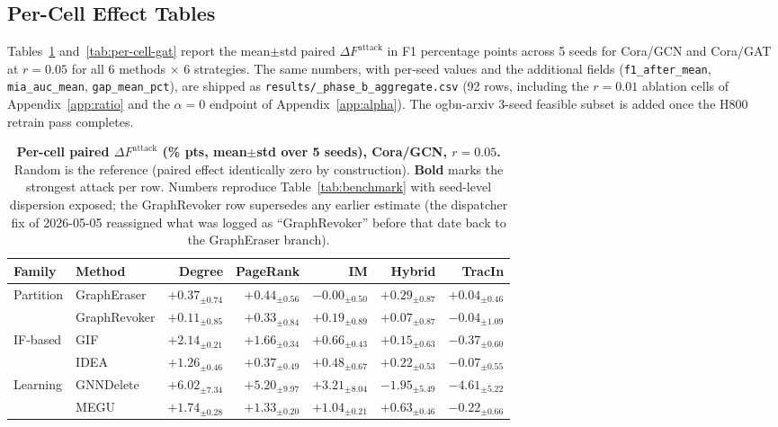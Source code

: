 \subsection{Per-Cell Effect Tables}
\label{app:per-cell}
Tables~\ref{tab:per-cell-gcn} and~\ref{tab:per-cell-gat} report the
mean$\pm$std paired $\Delta F^{\mathrm{attack}}$ in F1 percentage
points across 5 seeds for Cora/GCN and Cora/GAT at $r{=}0.05$ for
all 6 methods $\times$ 6 strategies. The same numbers, with per-seed
values and the additional fields (\texttt{f1\_after\_mean},
\texttt{mia\_auc\_mean}, \texttt{gap\_mean\_pct}), are shipped as
\texttt{results/\_phase\_b\_aggregate.csv} (92 rows, including the
$r{=}0.01$ ablation cells of Appendix~\ref{app:ratio} and the
$\alpha{=}0$ endpoint of Appendix~\ref{app:alpha}). The ogbn-arxiv
3-seed feasible subset is added once the H800 retrain pass completes.

\begin{table}[h]
\centering
\footnotesize
\setlength{\tabcolsep}{4pt}
\caption{\textbf{Per-cell paired $\Delta F^{\mathrm{attack}}$ (\% pts,
mean$\pm$std over 5 seeds), Cora/GCN, $r{=}0.05$.} Random is the
reference (paired effect identically zero by construction).
\textbf{Bold} marks the strongest attack per row. Numbers reproduce
Table~\ref{tab:benchmark} with seed-level dispersion exposed; the
GraphRevoker row supersedes any earlier estimate (the dispatcher fix
of 2026-05-05 reassigned what was logged as ``GraphRevoker'' before
that date back to the GraphEraser branch).}
\label{tab:per-cell-gcn}
\begin{tabular}{@{}llrrrrr@{}}
\toprule
Family & Method & Degree & PageRank & IM & Hybrid & TracIn \\
\midrule
\multirow{2}{*}{Partition}
 & GraphEraser  & $\mathbf{+0.37}_{\pm 0.74}$ & $+0.44_{\pm 0.56}$ & $-0.00_{\pm 0.50}$ & $+0.29_{\pm 0.87}$ & $+0.04_{\pm 0.46}$ \\
 & GraphRevoker & $+0.11_{\pm 0.85}$ & $\mathbf{+0.33}_{\pm 0.84}$ & $+0.19_{\pm 0.89}$ & $+0.07_{\pm 0.87}$ & $-0.04_{\pm 1.09}$ \\
\midrule
\multirow{2}{*}{IF-based}
 & GIF  & $\mathbf{+2.14}_{\pm 0.21}$ & $+1.66_{\pm 0.34}$ & $+0.66_{\pm 0.43}$ & $+0.15_{\pm 0.63}$ & $-0.37_{\pm 0.60}$ \\
 & IDEA & $\mathbf{+1.26}_{\pm 0.46}$ & $+0.37_{\pm 0.49}$ & $+0.48_{\pm 0.67}$ & $+0.22_{\pm 0.53}$ & $-0.07_{\pm 0.55}$ \\
\midrule
\multirow{2}{*}{Learning}
 & GNNDelete & $\mathbf{+6.02}_{\pm 7.34}$ & $+5.20_{\pm 9.97}$ & $+3.21_{\pm 8.04}$ & $-1.95_{\pm 5.49}$ & $-4.61_{\pm 5.22}$ \\
 & MEGU      & $\mathbf{+1.74}_{\pm 0.28}$ & $+1.33_{\pm 0.20}$ & $+1.04_{\pm 0.21}$ & $+0.63_{\pm 0.46}$ & $-0.22_{\pm 0.66}$ \\
\bottomrule
\end{tabular}
\end{table}

